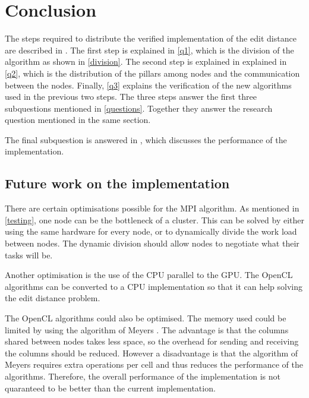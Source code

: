 \section{Conclusion}
The steps required to distribute the verified implementation of the edit distance are described in .
The first step is explained in \cref{q1}, which is the division of the algorithm as shown in \cref{division}.
The second step is explained in explained in \cref{q2}, which is the distribution of the pillars among nodes and the communication between the nodes.
Finally, \cref{q3} explains the verification of the new algorithms used in the previous two steps.
The three steps answer the first three subquestions mentioned in \cref{questions}.
Together they answer the research question mentioned in the same section.

The final subquestion is answered in , which discusses the performance of the implementation.

\subsection{Future work on the implementation} \label{future}
There are certain optimisations possible for the MPI algorithm.
As mentioned in \cref{testing}, one node can be the bottleneck of a cluster.
This can be solved by either using the same hardware for every node, or to dynamically divide the work load between nodes.
The dynamic division should allow nodes to negotiate what their tasks will be.

Another optimisation is the use of the CPU parallel to the GPU.
The OpenCL algorithms can be converted to a CPU implementation so that it can help solving the edit distance problem.

The OpenCL algorithms could also be optimised.
The memory used could be limited by using the algorithm of Meyers \cite{Meyers}.
The advantage is that the columns shared between nodes takes less space, so the overhead for sending and receiving the columns should be reduced.
However a disadvantage is that the algorithm of Meyers requires extra operations per cell and thus reduces the performance of the algorithms.
Therefore, the overall performance of the implementation is not quaranteed to be better than the current implementation.
